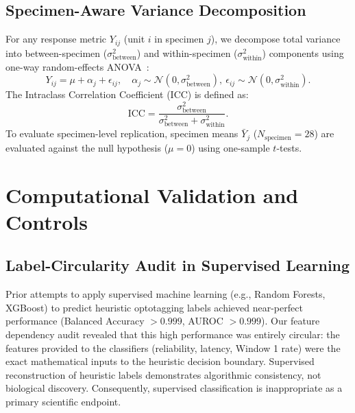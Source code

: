 \documentclass[10pt,journal,compsoc]{IEEEtran}
\begin{document}
\subsection{Specimen-Aware Variance Decomposition}
For any response metric $Y_{ij}$ (unit $i$ in specimen $j$), we decompose total variance into between-specimen ($\sigma_{\text{between}}^2$) and within-specimen ($\sigma_{\text{within}}^2$) components using one-way random-effects ANOVA~\cite{aarts2014solution,bates2015fitting}:
\begin{equation}
    Y_{ij} = \mu + \alpha_j + \epsilon_{ij}, \quad \alpha_j \sim \mathcal{N}(0, \sigma_{\text{between}}^2), \ \epsilon_{ij} \sim \mathcal{N}(0, \sigma_{\text{within}}^2).
\end{equation}
The Intraclass Correlation Coefficient (ICC) is defined as:
\begin{equation}
    \text{ICC} = \frac{\sigma_{\text{between}}^2}{\sigma_{\text{between}}^2 + \sigma_{\text{within}}^2}.
\end{equation}
To evaluate specimen-level replication, specimen means $\bar{Y}_j$ ($N_{\text{specimen}}=28$) are evaluated against the null hypothesis ($\mu = 0$) using one-sample $t$-tests.

\section{Computational Validation and Controls}

\subsection{Label-Circularity Audit in Supervised Learning}
Prior attempts to apply supervised machine learning (e.g., Random Forests, XGBoost) to predict heuristic optotagging labels achieved near-perfect performance (Balanced Accuracy $>0.999$, AUROC $>0.999$). Our feature dependency audit revealed that this high performance was entirely circular: the features provided to the classifiers (reliability, latency, Window 1 rate) were the exact mathematical inputs to the heuristic decision boundary. Supervised reconstruction of heuristic labels demonstrates algorithmic consistency, not biological discovery. Consequently, supervised classification is inappropriate as a primary scientific endpoint.
\end{document}
